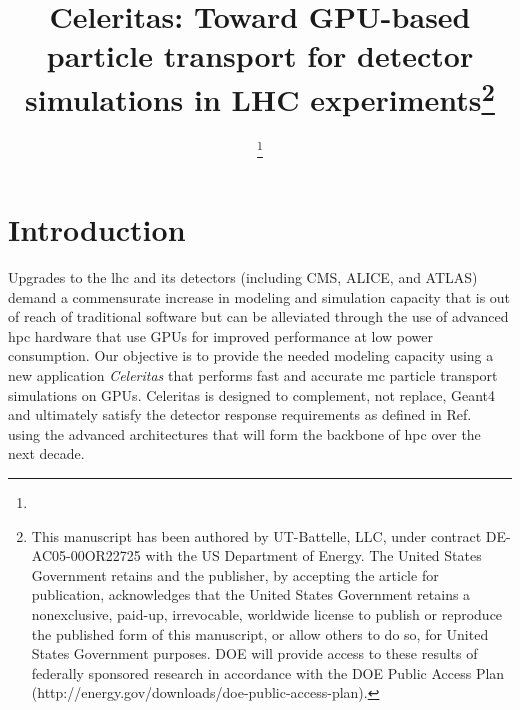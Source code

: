 \documentclass{webofc}
\begin{document}
\title{Celeritas: Toward GPU-based particle transport for detector simulations
    in LHC experiments\footnote{This manuscript has been authored by
    UT-Battelle, LLC, under contract DE-AC05-00OR22725 with the US Department of
    Energy. The United States Government retains and the publisher, by accepting
    the article for publication, acknowledges that the United States Government
    retains a nonexclusive, paid-up, irrevocable, worldwide license to publish
    or reproduce the published form of this manuscript, or allow others to do
    so, for United States Government purposes. DOE will provide access to these
    results of federally sponsored research in accordance with the DOE Public
    Access Plan (http://energy.gov/downloads/doe-public-access-plan).}}
    \author{
    \fnsep\thanks{}
    \and
     
    \and
     
    \and
     
    \and
     
    \and
     
    \and
     
    \and
     
}



\maketitle

\section{Introduction}
\label{sec:introduction}

Upgrades to the \ac{lhc} and its detectors (including CMS, ALICE, and ATLAS)
demand a commensurate increase in modeling and simulation capacity that is out
of reach of traditional software but can be alleviated through the use of
advanced \ac{hpc} hardware that use GPUs for improved performance at low power
consumption.  Our objective is to provide the needed modeling capacity using a
new application \emph{Celeritas} that performs fast and accurate \ac{mc}
particle transport simulations on GPUs. Celeritas is designed to complement, not
replace, Geant4 and ultimately satisfy the detector response requirements as
defined in Ref.~\cite{the_hep_software_foundation_roadmap_2019} using  the
advanced architectures that will form the backbone of \ac{hpc} over the next
decade.
\end{document}
